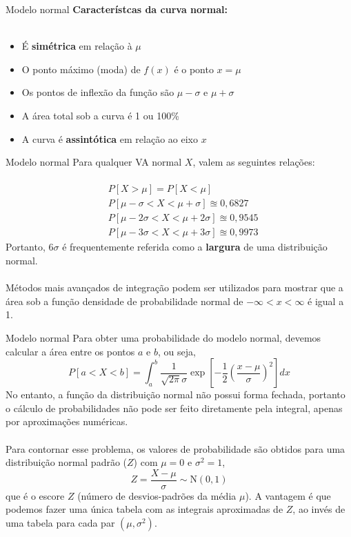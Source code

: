 \documentclass[10pt]{beamer}\usepackage[]{graphicx}\usepackage[]{color}
\theoremstyle{definition}
\begin{document}
\begin{frame}[fragile]{Modelo normal}
  \textbf{Característcas da curva normal:} \\~\\
  \begin{itemize}
  \item É \textbf{simétrica} em relação à $\mu$
  \item O ponto máximo (moda) de $f(x)$ é o ponto $x=\mu$
  \item Os pontos de inflexão da função são $\mu-\sigma$ e $\mu+\sigma$
  \item A área total sob a curva é 1 ou 100\%
  \item A curva é \textbf{assintótica} em relação ao eixo $x$
  \end{itemize}
\end{frame}

\begin{frame}[fragile]{Modelo normal}
  Para qualquer VA normal $X$, valem as seguintes relações: \\~\\
  \begin{align*}
    &P[X > \mu] = P[X < \mu] \\
    &P[\mu - \sigma < X < \mu + \sigma] \approxeq 0,6827 \\
    &P[\mu - 2\sigma < X < \mu + 2\sigma] \approxeq 0,9545 \\
    &P[\mu - 3\sigma < X < \mu + 3\sigma] \approxeq 0,9973
  \end{align*}
  Portanto, $6\sigma$ é frequentemente referida como a \textbf{largura}
  de uma distribuição normal. \\~\\
  Métodos mais avançados de integração podem ser utilizados para mostrar
  que a área sob a função densidade de probabilidade normal de $-\infty
  < x < \infty$ é igual a 1.
\end{frame}

\begin{frame}[fragile]{Modelo normal}
  Para obter uma probabilidade do modelo normal, devemos calcular a área
  entre os pontos $a$ e $b$, ou seja,
  \begin{equation*}
    P[a < X < b] = \int_a^b \frac{1}{\sqrt{2\pi}\sigma} \exp\left[-\frac{1}{2}
      \left( \frac{x - \mu}{\sigma}\right)^2\right] dx
  \end{equation*}
  No entanto, a função da distribuição normal não possui forma
  fechada, portanto o cálculo de probabilidades não pode ser feito
  diretamente pela integral, apenas por aproximações numéricas. \\~\\
  Para contornar esse problema, os valores de probabilidade são
  obtidos para uma distribuição normal padrão ($Z$) com $\mu = 0$ e
  $\sigma^2 = 1$,
  \begin{equation*}
    Z = \frac{X - \mu}{\sigma} \sim \text{N}(0,1)
  \end{equation*}
  que é o escore $Z$ (número de desvios-padrões da média $\mu$). A
  vantagem é que podemos fazer uma única tabela com as integrais
  aproximadas de $Z$, ao invés de uma tabela para cada par
  $(\mu,\sigma^2)$.
\end{frame}
\end{document}
